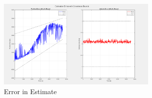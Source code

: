 \begin{figure}[H]
    \centering
    \includegraphics[width=0.7\textwidth]{PS8/Figures/error.png}
    \caption{Error in Estimate}
    \label{fig:hcw_velocity}
\end{figure}